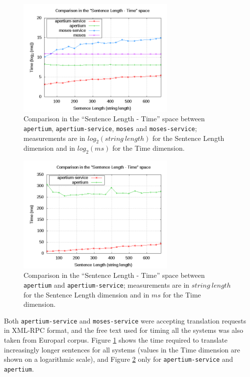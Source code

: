 \documentclass[11pt]{article}
\begin{document}
\begin{figure}[!ht]
\begin{center}
\includegraphics[width=7.75cm]{comp}
\end{center}
\caption{Comparison in the ``Sentence Length - Time'' space between {\tt apertium}, {\tt apertium-service}, {\tt moses} and {\tt moses-service}; measurements are in $log_{2}(string\ length)$ for the Sentence Length dimension and in $log_{2}(ms)$ for the Time dimension.}
\label{fig:comp}
\end{figure}

\begin{figure}[!ht]
\begin{center}
\includegraphics[width=7.75cm]{compap}
\end{center}
\caption{Comparison in the ``Sentence Length - Time'' space between {\tt apertium} and {\tt apertium-service}; measurements are in $string\ length$ for the Sentence Length dimension and in $ms$ for the Time dimension.}
\label{fig:compap}
\end{figure}


Both {\tt apertium-service} and {\tt moses-service} were accepting translation requests in XML-RPC format, and the free text used for timing all the systems was also taken from Europarl corpus. Figure \ref{fig:comp} shows the time required to translate increasingly longer sentences for all systems (values in the Time dimension are shown on a logarithmic scale), and Figure \ref{fig:compap} only for {\tt apertium-service} and {\tt apertium}.
\end{document}
